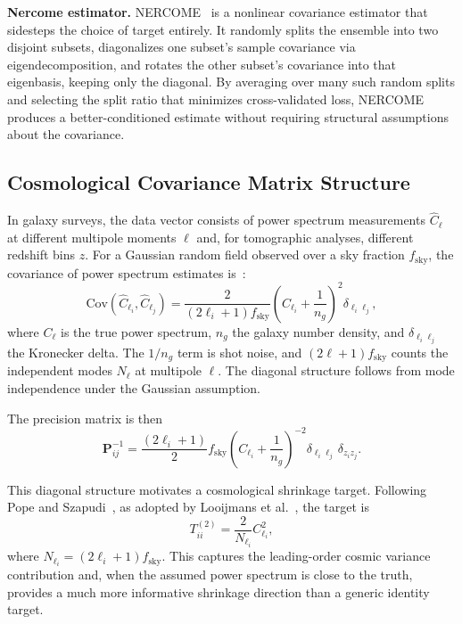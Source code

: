 \textbf{Nercome estimator.} NERCOME~\cite{joachimi2017non} is a nonlinear covariance estimator that sidesteps the choice of target entirely. It randomly splits the ensemble into two disjoint subsets, diagonalizes one subset's sample covariance via eigendecomposition, and rotates the other subset's covariance into that eigenbasis, keeping only the diagonal. By averaging over many such random splits and selecting the split ratio that minimizes cross-validated loss, NERCOME produces a better-conditioned estimate without requiring structural assumptions about the covariance.

\subsection{Cosmological Covariance Matrix Structure}
\label{sec:cosmo_cov}

In galaxy surveys, the data vector consists of power spectrum measurements $\hat{C}_\ell$ at different multipole moments $\ell$ and, for tomographic analyses, different redshift bins $z$. For a Gaussian random field observed over a sky fraction $f_{\text{sky}}$, the covariance of power spectrum estimates is~\cite{pope2008shrinkage}:
\begin{equation}
\label{eq:cosmo_cov}
\text{Cov}(\hat{C}_{\ell_i}, \hat{C}_{\ell_j}) = \frac{2}{(2\ell_i + 1) f_{\text{sky}}} \left(C_{\ell_i} + \frac{1}{n_g}\right)^2 \delta_{\ell_i \ell_j},
\end{equation}
where $C_{\ell}$ is the true power spectrum, $n_g$ the galaxy number density, and $\delta_{\ell_i \ell_j}$ the Kronecker delta. The $1/n_g$ term is shot noise, and $(2\ell+1)f_{\text{sky}}$ counts the independent modes $N_\ell$ at multipole $\ell$. The diagonal structure follows from mode independence under the Gaussian assumption.

The precision matrix is then
\begin{equation}
\label{eq:cosmo_precision}
\mathbf{P}_{ij}^{-1} = \frac{(2\ell_i + 1)}{2} f_{\text{sky}} \left(C_{\ell_i} + \frac{1}{n_g}\right)^{-2} \delta_{\ell_i \ell_j} \, \delta_{z_i z_j}.
\end{equation}

This diagonal structure motivates a cosmological shrinkage target. Following Pope and Szapudi~\cite{pope2008shrinkage}, as adopted by Looijmans et al.~\cite{looijmans2024comparison}, the target is
\begin{equation}
\label{eq:cosmo_target}
T^{(2)}_{ii} = \frac{2}{N_{\ell_i}} C_{\ell_i}^2,
\end{equation}
where $N_{\ell_i} = (2\ell_i + 1) f_{\text{sky}}$. This captures the leading-order cosmic variance contribution and, when the assumed power spectrum is close to the truth, provides a much more informative shrinkage direction than a generic identity target.

